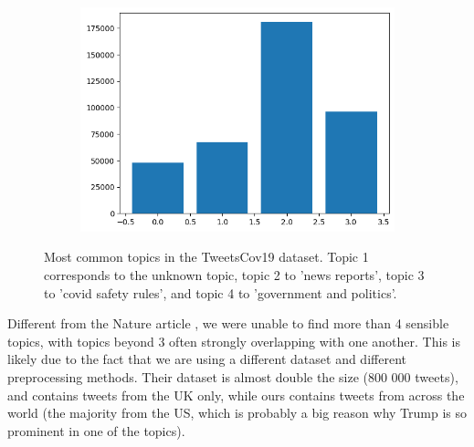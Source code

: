 \begin{figure}
 \centering
 \begin{subfigure}{0.5\columnwidth}
 \includegraphics[width=1\textwidth]{images/LDA_topics.png}
 \end{subfigure}
 \caption{Most common topics in the TweetsCov19 dataset. Topic 1 corresponds to the unknown topic, topic 2 to 'news reports', topic 3 to 'covid safety rules', and topic 4 to 'government and politics'.}
 \label{fig:lda_histo}
\end{figure}


Different from the Nature article \cite{ldaUK}, we were unable to find more than 4 sensible topics, with topics beyond 3 often strongly overlapping with one another. This is likely due to the fact that we are using a different dataset and different preprocessing methods. Their dataset is almost double the size (800 000 tweets), and contains tweets from the UK only, while ours contains tweets from across the world (the majority from the US, which is probably a big reason why Trump is so prominent in one of the topics).


